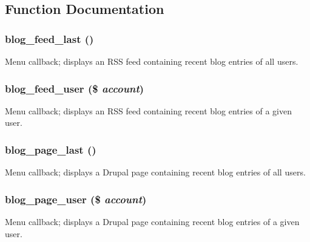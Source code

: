 \subsection{Function Documentation}
\hypertarget{blog_8pages_8inc_a4b08fa8027c0eaf79656992095ee33e5}{
\subsubsection[{blog\_\-feed\_\-last}]{\setlength{\rightskip}{0pt plus 5cm}blog\_\-feed\_\-last ()}}
\label{blog_8pages_8inc_a4b08fa8027c0eaf79656992095ee33e5}
Menu callback; displays an RSS feed containing recent blog entries of all users. \hypertarget{blog_8pages_8inc_ad543fb1fb96c40cb48615bc78dfa18e9}{
\subsubsection[{blog\_\-feed\_\-user}]{\setlength{\rightskip}{0pt plus 5cm}blog\_\-feed\_\-user (\$ {\em account})}}
\label{blog_8pages_8inc_ad543fb1fb96c40cb48615bc78dfa18e9}
Menu callback; displays an RSS feed containing recent blog entries of a given user. \hypertarget{blog_8pages_8inc_a6720685209529757688eed74112994e4}{
\subsubsection[{blog\_\-page\_\-last}]{\setlength{\rightskip}{0pt plus 5cm}blog\_\-page\_\-last ()}}
\label{blog_8pages_8inc_a6720685209529757688eed74112994e4}
Menu callback; displays a Drupal page containing recent blog entries of all users. \hypertarget{blog_8pages_8inc_a87fd5ef697f7fc4cccaf2c54933cc29a}{
\subsubsection[{blog\_\-page\_\-user}]{\setlength{\rightskip}{0pt plus 5cm}blog\_\-page\_\-user (\$ {\em account})}}
\label{blog_8pages_8inc_a87fd5ef697f7fc4cccaf2c54933cc29a}
Menu callback; displays a Drupal page containing recent blog entries of a given user. 